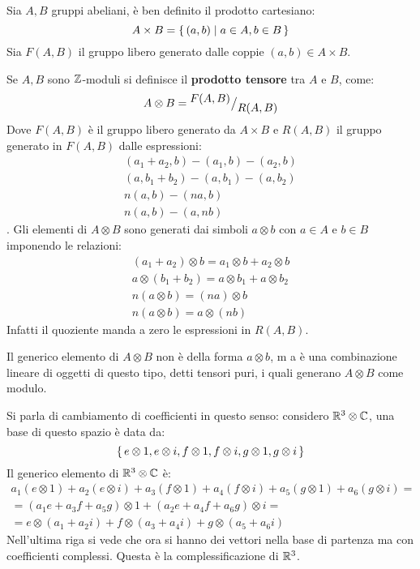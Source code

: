 Sia $ A, B $ gruppi abeliani, è ben definito il prodotto
cartesiano:
\[
  A \times B = \set{(a,b) | a \in A, b \in B}
\]
Sia $ F(A,B) $ il gruppo libero generato dalle coppie $ (a, b) \in A \times B $.
\begin{definition}
  Se $ A, B $ sono $ \mathbb{Z} $-moduli si definisce il \textbf{prodotto
    tensore} tra $ A $ e $ B $, come:
  \[
    A \otimes B = {^{\textstyle F(A,B)}\big/_{\textstyle R(A,B)}}
  \]
  Dove $ F(A,B) $ è il gruppo libero generato da $ A \times B $
  e $ R(A,B) $ il gruppo generato in $ F(A,B) $ dalle espressioni:
  \begin{gather*}
    (a_1 + a_2, b) - (a_1, b) - (a_2, b) \\
    (a, b_1 + b_2) - (a, b_1) - (a, b_2) \\
    n (a, b) - (na, b) \\
    n (a, b) - (a, nb)
  \end{gather*}.
  Gli elementi di $ A \otimes B $ sono generati dai simboli
  $ a \otimes b $ con $ a \in A $ e $ b \in B $ imponendo le relazioni:
  \begin{gather*}
    (a_1 + a_2) \otimes b = a_1 \otimes b + a_2 \otimes b \\
    a \otimes (b_1 + b_2) = a \otimes b_1 + a \otimes b_2 \\
    n (a \otimes b) = (na) \otimes b \\
    n (a \otimes b) = a \otimes (nb)
  \end{gather*}
  Infatti il quoziente manda a zero le espressioni in $ R(A,B) $.
\end{definition}
\begin{osservation}
  Il generico elemento di $ A \otimes B $ non è della forma $ a \otimes b $, m
  a è una combinazione lineare di oggetti di questo tipo, detti
  tensori puri, i quali generano $ A \otimes B $ come modulo.
\end{osservation}
\begin{example}
  Si parla di cambiamento di coefficienti in questo senso: considero
  $ \mathbb{R}^{3} \otimes \mathbb{C} $, una base di questo spazio è data da:
  \[
    \set{e \otimes 1, e \otimes i, f \otimes 1, f \otimes i, g \otimes 1, g \otimes i}
  \]
  Il generico elemento di $ \mathbb{R}^{3} \otimes \mathbb{C} $ è:
  \begin{gather*}
    a_1(e \otimes 1) + a_2(e \otimes i) + a_3(f \otimes 1) + a_4(f \otimes i) + a_5(g \otimes 1) + a_6(g \otimes i) = \\
    = (a_1e + a_3f + a_5g) \otimes 1 + (a_2e + a_4f + a_6g) \otimes i = \\
    = e \otimes (a_1 + a_2i) + f \otimes (a_3 + a_4i) + g \otimes (a_5 + a_6i)
  \end{gather*}
  Nell'ultima riga si vede che ora si hanno dei vettori nella base di partenza
  ma con coefficienti complessi. Questa è la complessificazione di $ \mathbb{R}^{3} $.
\end{example}
